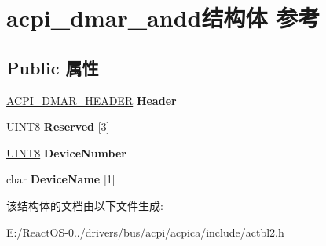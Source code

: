 \hypertarget{structacpi__dmar__andd}{}\section{acpi\+\_\+dmar\+\_\+andd结构体 参考}
\label{structacpi__dmar__andd}
\subsection*{Public 属性}
\begin{DoxyCompactItemize}
\item 
\mbox{\label{structacpi__dmar__andd_a37eeae0781478a7da408a1d465251c44}} 
\hyperlink{structacpi__dmar__header}{A\+C\+P\+I\+\_\+\+D\+M\+A\+R\+\_\+\+H\+E\+A\+D\+ER} {\bfseries Header}
\item 
\mbox{\label{structacpi__dmar__andd_ac301dc29baed2d6e7d884f867d69a590}} 
\hyperlink{_processor_bind_8h_ab27e9918b538ce9d8ca692479b375b6a}{U\+I\+N\+T8} {\bfseries Reserved} \mbox{[}3\mbox{]}
\item 
\mbox{\label{structacpi__dmar__andd_a4bea6b58691b77d394356c5bf37ef937}} 
\hyperlink{_processor_bind_8h_ab27e9918b538ce9d8ca692479b375b6a}{U\+I\+N\+T8} {\bfseries Device\+Number}
\item 
\mbox{\label{structacpi__dmar__andd_aedf5a9b3d353454d3cd1913207d07718}} 
char {\bfseries Device\+Name} \mbox{[}1\mbox{]}
\end{DoxyCompactItemize}


该结构体的文档由以下文件生成\+:\begin{DoxyCompactItemize}
\item 
E\+:/\+React\+O\+S-\/0../drivers/bus/acpi/acpica/include/actbl2.\+h\end{DoxyCompactItemize}
